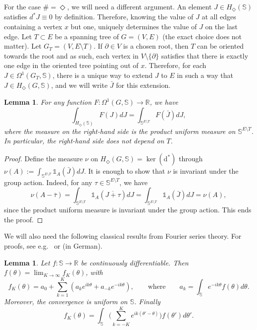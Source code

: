 \documentclass[11pt, reqno]{amsart}
\newtheorem{lemma}[theorem]{Lemma}
\numberwithin{equation}{section}
\theoremstyle{definition}
\theoremstyle{remark}
\newcommand{\id}{\mathds{1}}
\newcommand{\RR}{\mathbb{R}}
\renewcommand{\d}{\mathrm{d}}
\newcommand{\J}{J}
\newcommand{\coclosed}{\Diamond}
\newcommand{\Hstar}{\ensuremath{H_{\Diamond}} }
\begin{document}
For the case $\# = \coclosed$, we will need a different argument. 
An element $\J \in H_{\coclosed}(\mathbb{S})$ satisfies $d^* \J \equiv 0$ by definition. 
Therefore, knowing the value of $\J$ at all edges containing a vertex $x$ but one, 
uniquely determines the value of $\J$ on the last edge. 
Let $T\subset E$ be a spanning tree of $G = (V, E)$ (the exact choice does not matter). Let $G_T=(V,E\setminus T)$.
If $\partial \in V$ is a chosen root, then $T$ can be oriented towards the root and as such, 
each vertex in $V \setminus \{\partial\}$ satisfies that there is exactly one edge in the oriented tree pointing out of $x$. 
Therefore, for each $\J\in \Omega^{1}(G_T, \mathbb{S})$, there is a unique way to extend $\J$ to ${E}$ in such a way that
$\J \in \Hstar(G, \mathbb{S})$, and we will write $\bar{\J}$ for this extension. 

\begin{lemma} \label{Lapp: Hstar def}
	For any function $F: \Omega^1(G, \mathbb{S}) \to \RR$, we have
	\[	
		\int_{\Hstar(\mathbb{S})} F(\J) d \J = \int_{\mathbb{S}^{E \setminus T}} F(\bar{\J}) d \J, 
	\]
	where the measure on the right-hand side is the product uniform measure on $\mathbb{S}^{E \setminus T}$. 
	In particular, the right-hand side does not depend on $T$. 
\end{lemma}
	
\begin{proof}
	Define the measure $\nu$ on $\Hstar(G, \mathbb{S})=\ker(\d^*)$ through $\nu(A) := \int_{\mathbb{S}^{E \setminus T}} \id_{A}(\bar{\J}) d \J$.
	It is enough to show that $\nu$ is invariant under the group action. 
	Indeed, for any $\tau \in \mathbb{S}^{E \setminus T}$, we have 
	\[
	\nu( A-\bar\tau) = \int_{\mathbb{S}^{E \setminus T}} \id_{A}(\overline{\J+\tau}) d \J = \int_{\mathbb{S}^{E \setminus T}} \id_{A}(\bar{\J}) d \J=\nu(A),
	\]
	since the product uniform measure is invariant under the group action. This ends the proof. 
\end{proof}





We will also need the following classical results from Fourier series theory. For proofs, see e.g.~\cite{Bash} or \cite[Theorem IV.2.9]{Wer_FA} (in German).
\begin{lemma} \label{lem:fform}
	 Let $f: \mathbb S\to \mathbb R$ be continuously differentiable. 
	 Then $f(\theta)=\lim_{K\to \infty} f_K(\theta)$, with
	 \[
	 f_K(\theta)=a_0 + \sum_{k=1}^K (a_k e^{i k \theta} + a_{-k} e^{-i k \theta} ), \qquad \text{where} \qquad a_k=  \int_{\mathbb S} e^{- i k \theta}f(\theta){d} \theta.
	 \]
	 Moreover, the convergence is uniform on $\mathbb S$. Finally
	 \[
	  f_K(\theta) =  \int_{\mathbb S} \Big(\sum_{k=-K}^Ke^{ik (\theta'-\theta)}\Big) f(\theta' ){d}  \theta'.
	 \]
\end{lemma}
\end{document}
